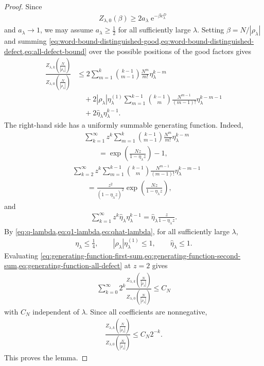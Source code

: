 \documentclass[a4paper,10pt]{article}
\numberwithin{equation}{section}
\theoremstyle{plain}
\theoremstyle{plain}
\theoremstyle{plain}
\theoremstyle{plain}
\theoremstyle{plain}
\theoremstyle{remark}
\theoremstyle{definition}
\newcommand{\ee}{\operatorname{e}}
\newcommand{\abs}[1]{\left\lvert#1\right\rvert}
\newcommand{\eq}[1]{\begin{align*}#1\end{align*}}
\newcommand{\eql}[1]{\begin{align}#1\end{align}}
\newcommand{\br}[1]{\left(#1\right)}
\begin{document}
\begin{proof}
Since
\eq{
Z_{\lambda,0}(\beta)
\geq
2a_\lambda\ee^{-\beta e_\lambda^D}
}
and $a_\lambda\to1$, we may assume $a_\lambda\geq\frac12$ for all sufficiently large $\lambda$. Setting $\beta=N/\abs{\rho_\lambda}$ and summing \cref{eq:word-bound-distinguished-good,eq:word-bound-distinguished-defect,eq:all-defect-bound} over the possible positions of the good factors gives
\begin{align}
\frac{Z_{\lambda,k}\br{\frac{N}{\abs{\rho_\lambda}}}}{Z_{\lambda,0}\br{\frac{N}{\abs{\rho_\lambda}}}}
&\leq
2\sum_{m=1}^k
\binom{k-1}{m-1}
\frac{N^m}{m!}
\eta_\lambda^{k-m}
\nonumber\\
&\quad+
2\abs{\rho_\lambda} \eta_\lambda^{(1)}
\sum_{m=1}^{k-1}
\binom{k-1}{m}
\frac{N^{m-1}}{(m-1)!}
\eta_\lambda^{k-m-1}
\nonumber\\
&\quad+
2\widehat\eta_\lambda \eta_\lambda^{k-1}.
\label{eq:uniform-k-combinatorial-bound}
\end{align}
The right-hand side has a uniformly summable generating function. Indeed,
\begin{align}
&\sum_{k=1}^\infty z^k
\sum_{m=1}^k
\binom{k-1}{m-1}
\frac{N^m}{m!}
\eta_\lambda^{k-m}
\nonumber\\
&\qquad=
\exp\left(\frac{Nz}{1-\eta_\lambda z}\right)-1,
\label{eq:generating-function-first-sum}
\end{align}
\begin{align}
&\sum_{k=2}^\infty z^k
\sum_{m=1}^{k-1}
\binom{k-1}{m}
\frac{N^{m-1}}{(m-1)!}
\eta_\lambda^{k-m-1}
\nonumber\\
&\qquad=
\frac{z^2}{(1-\eta_\lambda z)^2}
\exp\left(\frac{Nz}{1-\eta_\lambda z}\right),
\label{eq:generating-function-second-sum}
\end{align}
and
\eql{
\sum_{k=1}^\infty
z^k\widehat\eta_\lambda \eta_\lambda^{k-1}
=
\widehat\eta_\lambda\frac{z}{1-\eta_\lambda z}.
\label{eq:generating-function-all-defect}
}
By \cref{eq:q-lambda,eq:q1-lambda,eq:qhat-lambda}, for all sufficiently large $\lambda$,
\eq{
\eta_\lambda\leq\frac14,
\qquad
\abs{\rho_\lambda }\eta_\lambda^{(1)}\leq1,
\qquad
\widehat\eta_\lambda\leq1.
}
Evaluating \cref{eq:generating-function-first-sum,eq:generating-function-second-sum,eq:generating-function-all-defect} at $z=2$ gives
\eq{
\sum_{k=0}^\infty
2^k
\frac{Z_{\lambda,k}\br{\frac{N}{\abs{\rho_\lambda}}}}{Z_{\lambda,0}\br{\frac{N}{\abs{\rho_\lambda}}}}
\leq
C_N
}
with $C_N$ independent of $\lambda$. Since all coefficients are nonnegative,
\eq{
\frac{Z_{\lambda,k}\br{\frac{N}{\abs{\rho_\lambda}}}}{Z_{\lambda,0}\br{\frac{N}{\abs{\rho_\lambda}}}}
\leq
C_N2^{-k}.
}
This proves the lemma.
\end{proof}
\end{document}
